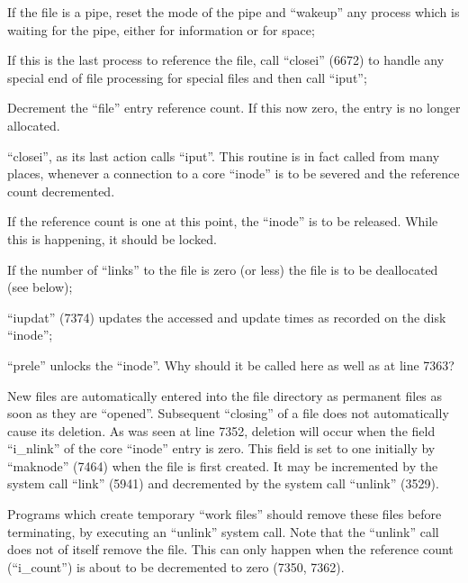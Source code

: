\bd
\item[6649:] If the file is a pipe, reset the
mode of the pipe and ``wakeup'' any
process which is waiting for the
pipe, either for information or
for space;

\item[6655:] If this is the last process to
 reference the file, call ``closei''
 (6672) to handle any special end
 of file processing for special
 files and then call ``iput'';

\item[6657:] Decrement the ``file'' entry reference count. If this now zero, the
 entry is no longer allocated.
\ed



``closei'', as its last action calls
``iput''. This routine is in fact called
from many places, whenever a connection
to a core ``inode'' is to be severed and
the reference count decremented.


\bd
\item[7350:] If the reference count is one at
 this point, the ``inode'' is to be
 released. While this is happening, it should be locked.

 \item[7352:] If the number of ``links'' to the
 file is zero (or less) the file
 is to be deallocated (see below);

\item[7357:] ``iupdat'' (7374) updates the
 accessed and update times as
recorded on the disk ``inode'';

\item[7358:] ``prele'' unlocks the ``inode''. Why
 should it be called here as well
 as at line 7363?
\ed



New files are automatically entered
into the file directory as permanent
files as soon as they are ``opened''.
Subsequent ``closing'' of a file does not
automatically cause its deletion. As
was seen at line 7352, deletion will
occur when the field ``i\_nlink'' of the
core ``inode'' entry is zero. This field
is set to one initially by ``maknode''
(7464) when the file is first created.
It may be incremented by the system
call ``link'' (5941) and decremented by
the system call ``unlink'' (3529).


Programs which create temporary ``work
files'' should remove these files before
terminating, by executing an ``unlink''
system call. Note that the ``unlink''
call does not of itself remove the
file. This can only happen when the
reference count (``i\_count'') is about to
be decremented to zero (7350, 7362).

